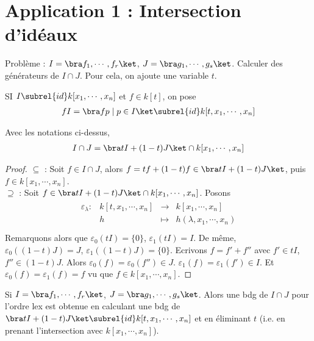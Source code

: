     \section{Application 1 : Intersection d'idéaux}
        Problème : $I = \bra f_1, \cdots, f_r \ket$, $J = \bra g_1, \cdots, g_s \ket$. Calculer des générateurs de $I \cap J$. Pour cela, on ajoute une variable $t$. 
        \begin{nota}
            SI $I \subrel{id} k[x_1, \cdots, x_n]$ et $f \in k[t]$, on pose
            \begin{align*}
                fI = \bra fp \mid p \in I \ket \subrel{id} k[t, x_1, \cdots, x_n]
            \end{align*}
        \end{nota}
        \begin{theo}
            Avec les notations ci-dessus,
            \begin{align*}
                I \cap J = \bra tI + (1 - t)J \ket \cap k[x_1, \cdots, x_n]
            \end{align*}
        \end{theo}
        \begin{proof}
            $\subseteq$ : Soit $f \in I \cap J$, alors $f = tf + (1 - t)f \in \bra tI + (1 - t)J \ket$, puis $f \in k[x_1, \cdots, x_n]$. \\
            $\supseteq$ : Soit $f \in \bra tI + (1-t)J \ket \cap k[x_1, \cdots, x_n]$. Posons
            \begin{align*}
                \begin{array}{cccc}
                    \varepsilon_\lambda : & k[t,x_1, \cdots, x_n] & \to & k[x_1, \cdots, x_n] \\
                    & h & \mapsto & h(\lambda, x_1, \cdots, x_n) \\
                \end{array}
            \end{align*}
            Remarquons alors que $\varepsilon_0(tI) = \{0\}$, $\varepsilon_1(tI) = I$. De même, $\varepsilon_0((1-t)J) = J$, $\varepsilon_1((1-t)J) = \{0\}$. Ecrivons $f = f' + f''$ avec $f' \in tI$, $f'' \in (1 - t)J$. Alors $\varepsilon_0(f) = \varepsilon_0(f'') \in J$. $\varepsilon_1(f) = \varepsilon_1(f') \in I$. Et $\varepsilon_0(f) = \varepsilon_1(f) = f$ vu que $f \in k[x_1, \cdots, x_n]$.
        \end{proof}
        \begin{coro}
            Si $I = \bra f_1, \cdots, f_r \ket$, $J = \bra g_1, \cdots, g_s \ket$. Alors une bdg de $I \cap J$ pour l'ordre lex est obtenue en calculant une bdg de $\bra tI + (1 - t)J \ket \subrel{id} k[t, x_1, \cdots, x_n]$ et en éliminant $t$ (i.e. en prenant l'intersection avec $k[x_1, \cdots, x_n]$).
        \end{coro}
        

